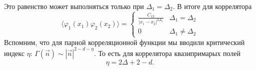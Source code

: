 \documentclass[a4paper,12pt]{article}
\theoremstyle{definition}
\theoremstyle{definition}
\theoremstyle{definition}
\begin{document}
Это равенство может выполняться только при $\Delta_{1}=\Delta_{2}$. В итоге для коррелятора
\begin{equation}
  \label{eq:190}
   \langle \varphi_{1}(x_{1}) \varphi_{2}(x_{2})\rangle =
   \begin{cases}
     \frac{C_{12}}{\left|x_{1}-x_{2}\right|^{2\Delta_{1}}} & \Delta_{1}=\Delta_{2}\\
     0 & \Delta_{1}\neq \Delta_{2}
   \end{cases}
\end{equation}
Вспомним, что для парной корреляционной функции мы вводили критический индекс $\eta$: $\Gamma(\vec n)\sim |\vec n|^{2-d-\eta}$. То есть для коррелятора квазипримарых полей
\begin{equation}
  \label{eq:191}
  \eta=2\Delta +2 -d.
\end{equation}
\end{document}
